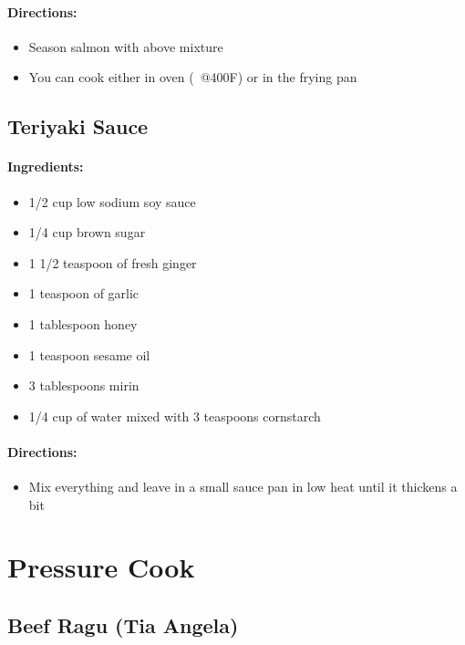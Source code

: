 \documentclass{article}
\begin{document}
\paragraph{Directions:}
\begin{itemize}
	\item Season salmon with above mixture
	\item You can cook either in oven (~@400F) or in the frying pan
\end{itemize}

\subsection{Teriyaki Sauce}

\paragraph{Ingredients:}

\begin{itemize}
	\item 1/2 cup low sodium soy sauce
	\item 1/4 cup brown sugar
	\item 1 1/2 teaspoon of fresh ginger
	\item 1 teaspoon of garlic
	\item 1 tablespoon honey
	\item 1 teaspoon sesame oil
	\item 3 tablespoons mirin
	\item 1/4 cup of water mixed with 3 teaspoons cornstarch
\end{itemize}

\paragraph{Directions:}
\begin{itemize}
	\item Mix everything and leave in a small sauce pan in low heat until it thickens a bit
\end{itemize}

\section{Pressure Cook}

\subsection{Beef Ragu (Tia Angela)}
\end{document}
